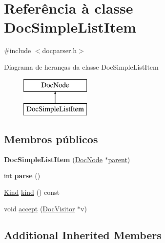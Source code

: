 \hypertarget{class_doc_simple_list_item}{\section{Referência à classe Doc\-Simple\-List\-Item}
\label{class_doc_simple_list_item}
}


{\ttfamily \#include $<$docparser.\-h$>$}

Diagrama de heranças da classe Doc\-Simple\-List\-Item\begin{figure}[H]
\begin{center}
\leavevmode
\includegraphics[height=2.000000cm]{class_doc_simple_list_item}
\end{center}
\end{figure}
\subsection*{Membros públicos}
\begin{DoxyCompactItemize}
\item 
\hypertarget{class_doc_simple_list_item_a111c39f5a85222f1fa3decff84a9b6ca}{{\bfseries Doc\-Simple\-List\-Item} (\hyperlink{class_doc_node}{Doc\-Node} $\ast$\hyperlink{class_doc_node_abd7f070d6b0a38b4da71c2806578d19d}{parent})}\label{class_doc_simple_list_item_a111c39f5a85222f1fa3decff84a9b6ca}

\item 
\hypertarget{class_doc_simple_list_item_a67007fc2be130666fbf3b065022756f4}{int {\bfseries parse} ()}\label{class_doc_simple_list_item_a67007fc2be130666fbf3b065022756f4}

\item 
\hyperlink{class_doc_node_aa10c9e8951b8ccf714a59ec321bdac5b}{Kind} \hyperlink{class_doc_simple_list_item_aa9d037bed9f9a083d0cd01485637d843}{kind} () const 
\item 
void \hyperlink{class_doc_simple_list_item_a7ba716e854ae2f8f87a4eb2140e302b6}{accept} (\hyperlink{class_doc_visitor}{Doc\-Visitor} $\ast$v)
\end{DoxyCompactItemize}
\subsection*{Additional Inherited Members}


